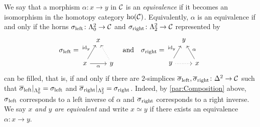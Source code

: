 \begin{numpar}\label{par:Equivalence}
	We say that a morphism $\alpha\colon x\rightarrow y$ in $\mathcal{C}$ is an \emph{equivalence} if it becomes an isomorphism in the homotopy category $\operatorname{ho}(\mathcal{C})$. Equivalently, $\alpha$ is an equivalence if and only if the horns $\sigma_\mathrm{left}\colon\Lambda_0^2\rightarrow\mathcal{C}$ and $\sigma_\mathrm{right}\colon\Lambda_2^2\rightarrow \mathcal{C}$ represented by\label{enum:Equivalence}
	\begin{equation*}
		\sigma_\mathrm{left}=\begin{tikzpicture}[commutative diagrams/every diagram,baseline=(mid.base)]
			\path node[outer sep=0.25ex] (0) at (0,0) {$x$} ++(0:3.8em) node[text depth=0pt,outer sep=0.25ex] (1) {$y$} ++ (120:3.8em) node[outer sep=0.25ex] (2) {$x$};
			\path (0) to node[pos=0.5] (mid) {} (2);
			\path[commutative diagrams/.cd, every arrow, every label]
			(0) edge node[swap] {$\alpha$} (1)
			(1) edge[dotted] (2)
			(0) edge node {$\id_y$} (2);
		\end{tikzpicture}
		\quad\text{and}\quad
		\sigma_\mathrm{right}=\begin{tikzpicture}[commutative diagrams/every diagram,baseline=(mid.base)]
			\path node[outer sep=0.25ex] (0) at (0,0) {$y$} ++(0:3.8em) node[text depth=0pt,outer sep=0.25ex] (1) {$x$} ++ (120:3.8em) node[outer sep=0.25ex] (2) {$y$};
			\path (0) to node[pos=0.5] (mid) {} (2);
			\path[commutative diagrams/.cd, every arrow, every label]
			(0) edge[dotted] (1)
			(1) edge node[swap] {$\alpha$} (2)
			(0) edge node {$\id_y$} (2);
		\end{tikzpicture}
	\end{equation*}
	can be filled, that is, if and only if there are $2$-simplices $\ov\sigma_\mathrm{left},\ov\sigma_\mathrm{right}\colon \Delta^2\rightarrow\Cc$ such that $\ov\sigma_\mathrm{left}|_{\Lambda_0^2}=\sigma_\mathrm{left}$ and $\ov\sigma_\mathrm{right}|_{\Lambda_2^2}=\sigma_\mathrm{right}$. Indeed, by \cref{par:Composition} above, $\ov\sigma_\mathrm{left}$ corresponds to a left inverse of $\alpha$ and $\ov\sigma_\mathrm{right}$ corresponds to a right inverse. We say \emph{$x$ and $y$ are equivalent} and write $x\simeq y$ if there exists an equivalence $\alpha\colon x\rightarrow y$.
\end{numpar}

